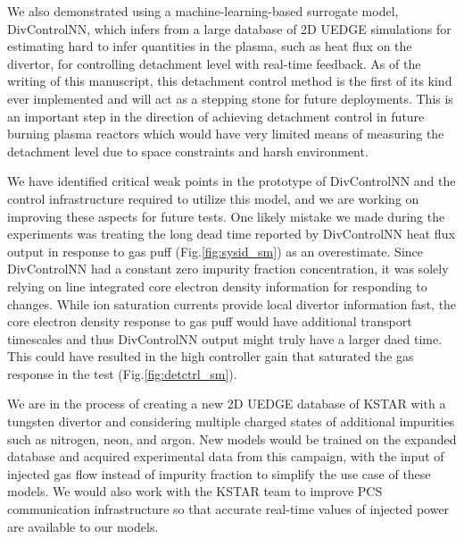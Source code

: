 We also demonstrated using a machine-learning-based surrogate model, DivControlNN, which infers from a large database of 2D UEDGE simulations for estimating hard to infer quantities in the plasma, such as heat flux on the divertor, for controlling detachment level with real-time feedback.
As of the writing of this manuscript, this detachment control method is the first of its kind ever implemented and will act as a stepping stone for future deployments.
This is an important step in the direction of achieving detachment control in future burning plasma reactors which would have very limited means of measuring the detachment level due to space constraints and harsh environment.

We have identified critical weak points in the prototype of DivControlNN and the control infrastructure required to utilize this model, and we are working on improving these aspects for future tests.
One likely mistake we made during the experiments was treating the long dead time reported by DivControlNN heat flux output in response to gas puff (Fig.\ref{fig:sysid_sm}) as an overestimate.
Since DivControlNN had a constant zero impurity fraction concentration, it was solely relying on line integrated core electron density information for responding to changes.
While ion saturation currents provide local divertor information fast, the core electron density response to gas puff would have additional transport timescales and thus DivControlNN output might truly have a larger daed time.
This could have resulted in the high controller gain that saturated the gas response in the test (Fig.\ref{fig:detctrl_sm}).

We are in the process of creating a new 2D UEDGE database of KSTAR with a tungsten divertor and considering multiple charged states of additional impurities such as nitrogen, neon, and argon.
New models would be trained on the expanded database and acquired experimental data from this campaign, with the input of injected gas flow instead of impurity fraction to simplify the use case of these models.
We would also work with the KSTAR team to improve PCS communication infrastructure so that accurate real-time values of injected power are available to our models.

